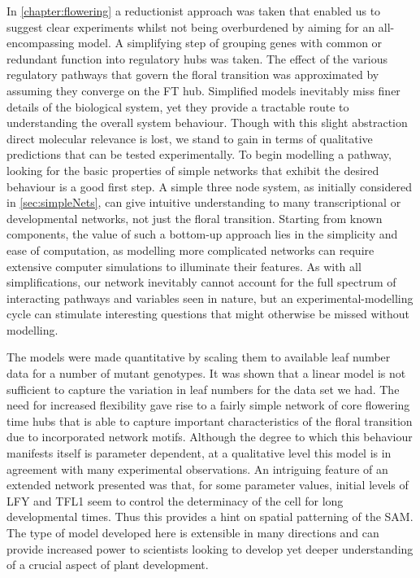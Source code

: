 In \autoref{chapter:flowering} a reductionist approach was taken that enabled us to suggest clear experiments whilst not being overburdened by aiming for an all-encompassing model.
A simplifying step of grouping genes with common or redundant function into regulatory hubs was taken.
The effect of the various regulatory pathways that govern the floral transition was approximated by assuming they converge on the FT hub.
Simplified models inevitably miss finer details of the biological system, yet they provide a tractable route to understanding the overall system behaviour.
Though with this slight abstraction direct molecular relevance is lost, we stand to gain in terms of qualitative predictions that can be tested experimentally.
To begin modelling a pathway, looking for the basic properties of simple networks that exhibit the desired behaviour is a good first step.
A simple three node system, as initially considered in \autoref{sec:simpleNets}, can give intuitive understanding to many transcriptional or developmental networks, not just the floral transition.
Starting from known components, the value of such a bottom-up approach lies in the simplicity and ease of computation, as modelling more complicated networks can require extensive computer simulations to illuminate their features.
As with all simplifications, our network inevitably cannot account for the full spectrum of interacting pathways and variables seen in nature, but an experimental-modelling cycle can stimulate interesting questions that might otherwise be missed without modelling.

The models were made quantitative by scaling them to available leaf number data for a number of mutant genotypes.
It was shown that a linear model is not sufficient to capture the variation in leaf numbers for the data set we had.
The need for increased flexibility gave rise to a fairly simple network of core flowering time hubs that is able to capture important characteristics of the floral transition due to incorporated network motifs.
Although the degree to which this behaviour manifests itself is parameter dependent, at a qualitative level this model is in agreement with many experimental observations.
An intriguing feature of an extended network presented was that, for some parameter values, initial levels of LFY and TFL1 seem to control the determinacy of the cell for long developmental times.
Thus this provides a hint on spatial patterning of the SAM.
The type of model developed here is extensible in many directions and can provide increased power to scientists looking to develop yet deeper understanding of a crucial aspect of plant development.


